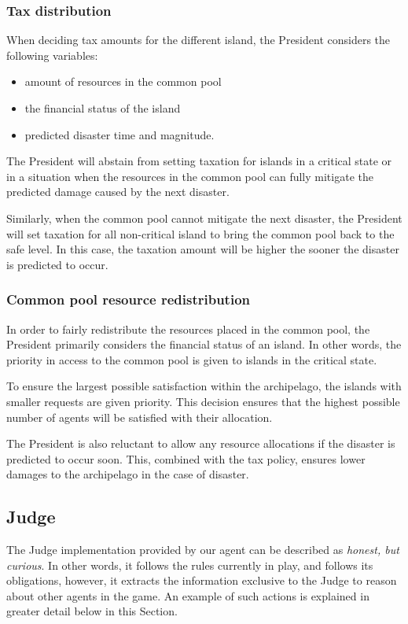 \subsubsection{Tax distribution}
When deciding tax amounts for the different island, the President considers the following variables:
\begin{itemize}
    \item amount of resources in the common pool
    \item the financial status of the island
    \item predicted disaster time and magnitude.
\end{itemize}

The President will abstain from setting taxation for islands in a critical state or in a situation when the resources in the common pool can fully mitigate the predicted damage caused by the next disaster. 

Similarly, when the common pool cannot mitigate the next disaster, the President will set taxation for all non-critical island to bring the common pool back to the safe level. In this case, the taxation amount will be higher the sooner the disaster is predicted to occur.

\subsubsection{Common pool resource redistribution}
In order to fairly redistribute the resources placed in the common pool, the President primarily considers the financial status of an island. In other words, the priority in access to the common pool is given to islands in the critical state. 

To ensure the largest possible satisfaction within the archipelago, the islands with smaller requests are given priority. This decision ensures that the highest possible number of agents will be satisfied with their allocation.

The President is also reluctant to allow any resource allocations if the disaster is predicted to occur soon. This, combined with the tax policy, ensures lower damages to the archipelago in the case of disaster.


\subsection{Judge}
\label{subsec:team4:judge}
The Judge implementation provided by our agent can be described as \emph{honest, but curious}. In other words, it follows the rules currently in play, and follows its obligations, however, it extracts the information exclusive to the Judge to reason about other agents in the game. An example of such actions is explained in greater detail below in this Section.

